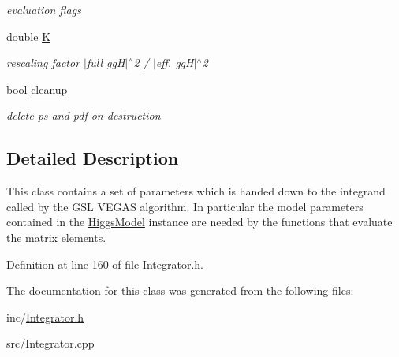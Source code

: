 \begin{DoxyCompactItemize}
\begin{DoxyCompactList}\small\item\em evaluation flags \end{DoxyCompactList}\item 
\hypertarget{classintegrand__par_afae7075055e10bd188d53fe2e1edd1e3}{double \hyperlink{classintegrand__par_afae7075055e10bd188d53fe2e1edd1e3}{K}}\label{classintegrand__par_afae7075055e10bd188d53fe2e1edd1e3}

\begin{DoxyCompactList}\small\item\em rescaling factor $\vert$full gg\-H$\vert$$^\wedge$2 / $\vert$eff. gg\-H$\vert$$^\wedge$2 \end{DoxyCompactList}\item 
\hypertarget{classintegrand__par_a1655b43b8c9e09a8bfbab014375aca49}{bool \hyperlink{classintegrand__par_a1655b43b8c9e09a8bfbab014375aca49}{cleanup}}\label{classintegrand__par_a1655b43b8c9e09a8bfbab014375aca49}

\begin{DoxyCompactList}\small\item\em delete ps and pdf on destruction \end{DoxyCompactList}\end{DoxyCompactItemize}


\subsection{Detailed Description}
This class contains a set of parameters which is handed down to the integrand called by the G\-S\-L V\-E\-G\-A\-S algorithm. In particular the model parameters contained in the \hyperlink{classHiggsModel}{Higgs\-Model} instance are needed by the functions that evaluate the matrix elements. 

Definition at line 160 of file Integrator.\-h.



The documentation for this class was generated from the following files\-:\begin{DoxyCompactItemize}
\item 
inc/\hyperlink{Integrator_8h}{Integrator.\-h}\item 
src/Integrator.\-cpp\end{DoxyCompactItemize}
